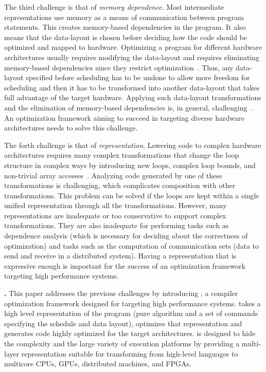 The third challenge is that of \emph{memory dependence}.  Most intermediate representations use memory as a means of communication between program statements.  This creates memory-based dependencies in the program.  It also means that the data-layout is chosen before deciding how the code should be optimized and mapped to hardware.  Optimizing a program for different hardware architectures usually requires modifying the data-layout and requires eliminating memory-based dependencies since they restrict optimization~\cite{maydan1992data}.  Thus, any data-layout specified before scheduling has to be undone to allow more freedom for scheduling and then it has to be transformed into another data-layout that takes full advantage of the target hardware.
Applying such data-layout transformations and the elimination of memory-based dependencies is, in general, challenging~\cite{gupta1997privatization,autoPrivatPeng,li_array_1992,feautrier_array_1988,midkiff_automatic_2012,maydan_array-data_1993,lefebvre_automatic_1998,Qui00,Darte_contraction_2005}.  An optimization framework aiming to succeed in targeting diverse hardware architectures needs to solve this challenge.

The forth challenge is that of \emph{representation}.  Lowering code to complex hardware architectures requires many complex transformations that change the loop structure in complex ways by introducing new loops, complex loop bounds, and non-trivial array accesses~\cite{wolf1991loop}.  Analyzing code generated by one of these transformations is challenging, which complicates composition with other transformations.  This problem can be solved if the loops are kept within a single unified representation through all the transformations.  However, many representations are inadequate or too conservative to support complex transformations.  They are also inadequate for performing tasks such as dependence analysis (which is necessary for deciding about the correctness of optimization) and tasks such as the computation of communication sets (data to send and receive in a distributed system).  Having a representation that is expressive enough is important for the success of an optimization framework targeting high performance systems.

\textbf{\framework{}.}
This paper addresses the previous challenges by introducing \framework{}, a compiler optimization framework designed for targeting high performance systems.  \framework{} takes a high level representation of the program (pure algorithm and a set of commands specifying the schedule and data layout), optimizes that representation and generates code highly optimized for the target architectures.  \framework{} is designed to hide the complexity and the large variety of execution platforms by providing a multi-layer representation suitable for transforming from high-level languages to multicore CPUs, GPUs, distributed machines, and FPGAs.

